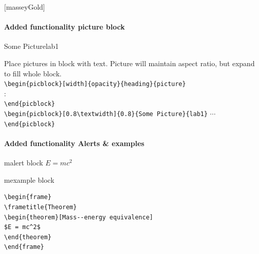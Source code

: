 \documentclass[10pt,aspectratio=169]{beamer}
\begin{document}

[masseyGold]
\begin{frame}[fragile]
\framesubtitle{Added functionality picture block}

\vspace*{-2ex}

\footnotesize
\def\picname{lab1}

\begin{picblock}[0.8\textwidth]{1}{Some Picture}{\picname}

\color{masseyBlack}

Place pictures in block with text.  Picture will maintain aspect ratio, but expand to fill whole block.\\

\verb|\begin{picblock}[width]{opacity}{heading}{picture}|\\
\hspace*{2em}:\\[1ex]
\verb|\end{picblock}|\\

\verb|\begin{picblock}[0.8\textwidth]{0.8}{Some Picture}{lab1}|
$\cdots$\verb|\end{picblock}|
\end{picblock}
\end{frame}



\begin{frame}[fragile]
\framesubtitle{Added functionality Alerts \& examples}
\begin{malert}[0.5\textwidth]{1}{malert block}
$E = mc^2$
\end{malert}

\begin{mexample}[0.8\textwidth]{1}{mexample block}
\begin{verbatim}
\begin{frame}
\frametitle{Theorem}
\begin{theorem}[Mass--energy equivalence]
$E = mc^2$
\end{theorem}
\end{frame}\end{verbatim}
\end{mexample}
\end{frame}
\end{document}
